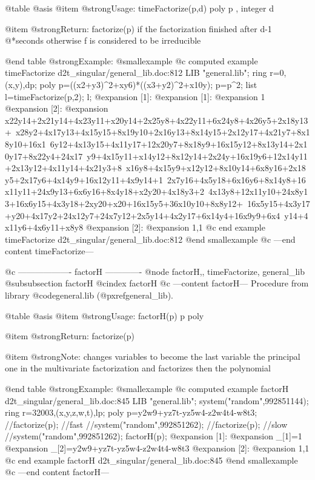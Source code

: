 @table @asis
@item @strong{Usage:}
timeFactorize(p,d) poly p , integer d

@item @strong{Return:}
factorize(p) if the factorization finished after d-1
@*seconds otherwise f is considered to be irreducible

@end table
@strong{Example:}
@smallexample
@c computed example timeFactorize d2t_singular/general_lib.doc:812 
LIB "general.lib";
ring r=0,(x,y),dp;
poly p=((x2+y3)^2+xy6)*((x3+y2)^2+x10y);
p=p^2;
list l=timeFactorize(p,2);
l;
@expansion{} [1]:
@expansion{}    [1]:
@expansion{}       1
@expansion{}    [2]:
@expansion{}       x22y14+2x21y14+4x23y11+x20y14+2x25y8+4x22y11+6x24y8+4x26y5+2x18y13+\
   x28y2+4x17y13+4x15y15+8x19y10+2x16y13+8x14y15+2x12y17+4x21y7+8x18y10+16x1\
   6y12+4x13y15+4x11y17+12x20y7+8x18y9+16x15y12+8x13y14+2x10y17+8x22y4+24x17\
   y9+4x15y11+x14y12+8x12y14+2x24y+16x19y6+12x14y11+2x13y12+4x11y14+4x21y3+8\
   x16y8+4x15y9+x12y12+8x10y14+6x8y16+2x18y5+2x17y6+4x14y9+16x12y11+4x9y14+1\
   2x7y16+4x5y18+6x16y6+8x14y8+16x11y11+24x9y13+6x6y16+8x4y18+x2y20+4x18y3+2\
   4x13y8+12x11y10+24x8y13+16x6y15+4x3y18+2xy20+x20+16x15y5+36x10y10+8x8y12+\
   16x5y15+4x3y17+y20+4x17y2+24x12y7+24x7y12+2x5y14+4x2y17+6x14y4+16x9y9+6x4\
   y14+4x11y6+4x6y11+x8y8
@expansion{} [2]:
@expansion{}    1,1
@c end example timeFactorize d2t_singular/general_lib.doc:812
@end smallexample
@c ---end content timeFactorize---

@c ------------------- factorH -------------
@node factorH,, timeFactorize, general_lib
@subsubsection factorH
@cindex factorH
@c ---content factorH---
Procedure from library @code{general.lib} (@pxref{general_lib}).

@table @asis
@item @strong{Usage:}
factorH(p) p poly

@item @strong{Return:}
factorize(p)

@item @strong{Note:}
changes variables to become the last variable the principal
one in the multivariate factorization and factorizes then
the polynomial

@end table
@strong{Example:}
@smallexample
@c computed example factorH d2t_singular/general_lib.doc:845 
LIB "general.lib";
system("random",992851144);
ring r=32003,(x,y,z,w,t),lp;
poly p=y2w9+yz7t-yz5w4-z2w4t4-w8t3;
//factorize(p);  //fast
//system("random",992851262);
//factorize(p);  //slow
//system("random",992851262);
factorH(p);
@expansion{} [1]:
@expansion{}    _[1]=1
@expansion{}    _[2]=y2w9+yz7t-yz5w4-z2w4t4-w8t3
@expansion{} [2]:
@expansion{}    1,1
@c end example factorH d2t_singular/general_lib.doc:845
@end smallexample
@c ---end content factorH---
